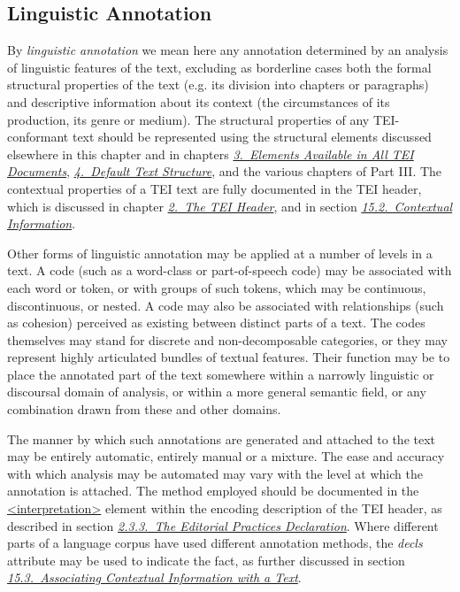 \subsection[{Linguistic Annotation}]{Linguistic Annotation}\label{AILA}\par
By \textit{linguistic annotation} we mean here any annotation determined by an analysis of linguistic features of the text, excluding as borderline cases both the formal structural properties of the text (e.g. its division into chapters or paragraphs) and descriptive information about its context (the circumstances of its production, its genre or medium). The structural properties of any TEI-conformant text should be represented using the structural elements discussed elsewhere in this chapter and in chapters \textit{\hyperref[CO]{3.\ Elements Available in All TEI Documents}}, \textit{\hyperref[DS]{4.\ Default Text Structure}}, and the various chapters of Part III. The contextual properties of a TEI text are fully documented in the TEI header, which is discussed in chapter \textit{\hyperref[HD]{2.\ The TEI Header}}, and in section \textit{\hyperref[CCAH]{15.2.\ Contextual Information}}.\par
Other forms of linguistic annotation may be applied at a number of levels in a text. A code (such as a word-class or part-of-speech code) may be associated with each word or token, or with groups of such tokens, which may be continuous, discontinuous, or nested. A code may also be associated with relationships (such as cohesion) perceived as existing between distinct parts of a text. The codes themselves may stand for discrete and non-decomposable categories, or they may represent highly articulated bundles of textual features. Their function may be to place the annotated part of the text somewhere within a narrowly linguistic or discoursal domain of analysis, or within a more general semantic field, or any combination drawn from these and other domains. \par
The manner by which such annotations are generated and attached to the text may be entirely automatic, entirely manual or a mixture. The ease and accuracy with which analysis may be automated may vary with the level at which the annotation is attached. The method employed should be documented in the \hyperref[TEI.interpretation]{<interpretation>} element within the encoding description of the TEI header, as described in section \textit{\hyperref[HD53]{2.3.3.\ The Editorial Practices Declaration}}. Where different parts of a language corpus have used different annotation methods, the {\itshape decls} attribute may be used to indicate the fact, as further discussed in section \textit{\hyperref[CCAS]{15.3.\ Associating Contextual Information with a Text}}.
